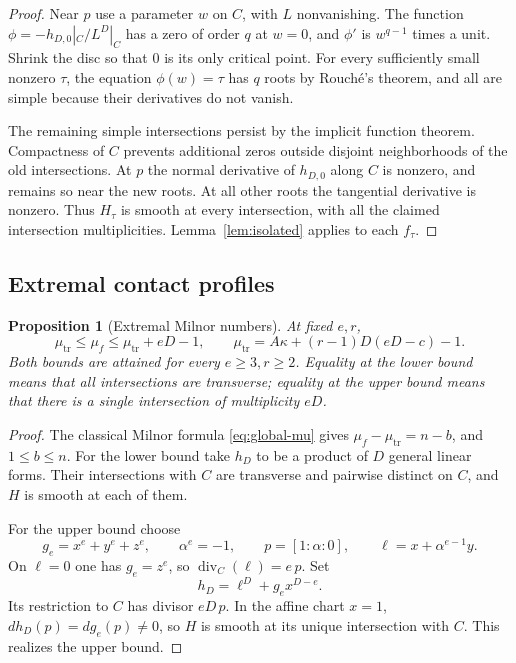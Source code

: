 \documentclass[11pt]{article}
\numberwithin{equation}{section}
\newtheorem{proposition}[theorem]{Proposition}
\theoremstyle{definition}
\theoremstyle{remark}
\begin{document}
\begin{proof}
Near $p$ use a parameter $w$ on $C$, with $L$ nonvanishing.
The function $\phi=-h_{D,0}|_C/L^D|_C$ has a zero of order
$q$ at $w=0$, and $\phi'$ is $w^{q-1}$ times a unit.
Shrink the disc so that $0$ is its only critical point.
For every sufficiently small nonzero $\tau$, the equation
$\phi(w)=\tau$ has $q$ roots by Rouch\'e's theorem, and all
are simple because their derivatives do not vanish.

The remaining simple intersections persist by the implicit
function theorem. Compactness of $C$ prevents additional
zeros outside disjoint neighborhoods of the old intersections.
At $p$ the normal derivative of $h_{D,0}$ along $C$ is nonzero,
and remains so near the new roots. At all other roots the
tangential derivative is nonzero. Thus $H_\tau$ is smooth at
every intersection, with all the claimed intersection
multiplicities. Lemma~\ref{lem:isolated} applies to each $f_\tau$.
\end{proof}

\subsection{Extremal contact profiles}

\begin{proposition}[Extremal Milnor numbers]\label{prop:milnor-bounds}
At fixed $e,r$,
\begin{equation}\label{eq:milnor-bounds}
 \mu_{\mathrm{tr}}\le\mu_f\le\mu_{\mathrm{tr}}+eD-1,
 \qquad
 \mu_{\mathrm{tr}}=A\kappa+(r-1)D(eD-c)-1.
\end{equation}
Both bounds are attained for every $e\ge3,r\ge2$.
Equality at the lower bound means that all intersections are
transverse; equality at the upper bound means that there is
a single intersection of multiplicity $eD$.
\end{proposition}

\begin{proof}
The classical Milnor formula \eqref{eq:global-mu} gives
$\mu_f-\mu_{\mathrm{tr}}=n-b$, and $1\le b\le n$.
For the lower bound take $h_D$ to be a product of $D$ general
linear forms. Their intersections with $C$ are transverse and
pairwise distinct on $C$, and $H$ is smooth at each of them.

For the upper bound choose
\[
 g_e=x^e+y^e+z^e,\qquad
 \alpha^e=-1,\qquad p=[1:\alpha:0],\qquad
 \ell=x+\alpha^{e-1}y.
\]
On $\ell=0$ one has $g_e=z^e$, so
$\operatorname{div}_C(\ell)=e\,p$. Set
\begin{equation}\label{eq:maximal-contact-example}
 h_D=\ell^D+g_e x^{D-e}.
\end{equation}
Its restriction to $C$ has divisor $eD\,p$.
In the affine chart $x=1$,
$dh_D(p)=dg_e(p)\ne0$, so $H$ is smooth at its unique
intersection with $C$. This realizes the upper bound.
\end{proof}
\end{document}
